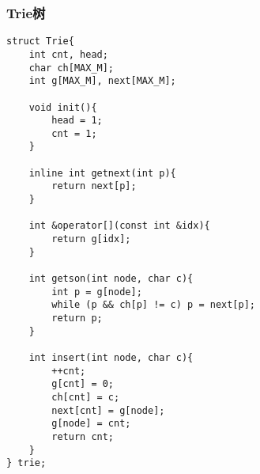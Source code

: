 \subsubsection{Trie树}
\begin{verbatim}
struct Trie{
    int cnt, head;
    char ch[MAX_M];
    int g[MAX_M], next[MAX_M];

    void init(){
        head = 1;
        cnt = 1;
    }

    inline int getnext(int p){
        return next[p];
    }

    int &operator[](const int &idx){
        return g[idx];
    }

    int getson(int node, char c){
        int p = g[node];
        while (p && ch[p] != c) p = next[p];
        return p;
    }

    int insert(int node, char c){
        ++cnt;
        g[cnt] = 0;
        ch[cnt] = c;
        next[cnt] = g[node];
        g[node] = cnt;
        return cnt;
    }
} trie;

\end{verbatim}
